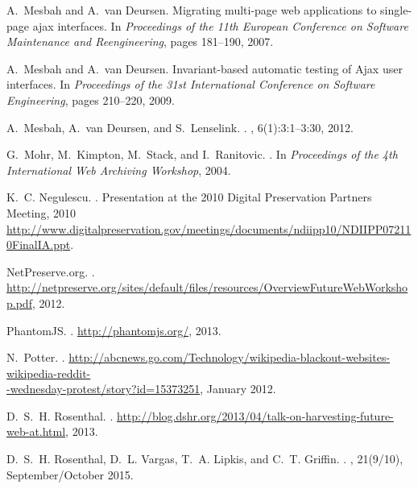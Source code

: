 \documentclass{sig-alternate}
\begin{document}
\begin{thebibliography}{10}
A.~Mesbah and A.~van Deursen.
\newblock Migrating multi-page web applications to single-page ajax interfaces.
\newblock In {\em Proceedings of the 11th European Conference on Software
  Maintenance and Reengineering}, pages 181--190, 2007.

A.~Mesbah and A.~van Deursen.
\newblock Invariant-based automatic testing of {A}jax user interfaces.
\newblock In {\em Proceedings of the 31st International Conference on Software
  Engineering}, pages 210--220, 2009.

A.~Mesbah, A.~van Deursen, and S.~Lenselink.
.
, 6(1):3:1--3:30, 2012.

G.~Mohr, M.~Kimpton, M.~Stack, and I.~Ranitovic.
.
\newblock In {\em Proceedings of the 4th International Web Archiving Workshop},
  2004.

K.~C. Negulescu.
.
\newblock Presentation at the 2010 Digital Preservation Partners Meeting, 2010
  \url{http://www.digitalpreservation.gov/meetings/documents/ndiipp10/NDIIPP072110FinalIA.ppt}.

{NetPreserve.org}.
.
\newblock
  \url{http://netpreserve.org/sites/default/files/resources/OverviewFutureWebWorkshop.pdf},
  2012.

{PhantomJS}.
.
\newblock \url{http://phantomjs.org/}, 2013.

N.~Potter.
.
\newblock
  \url{http://abcnews.go.com/Technology/wikipedia-blackout-websites-wikipedia-reddit-}\\\url{-wednesday-protest/story?id=15373251},
  January 2012.

D.~S.~H. Rosenthal.
.
\newblock
  \url{http://blog.dshr.org/2013/04/talk-on-harvesting-future-web-at.html},
  2013.

D.~S.~H. Rosenthal, D.~L. Vargas, T.~A. Lipkis, and C.~T. Griffin.
.
, 21(9/10), September/October 2015.


\end{thebibliography}
\end{document}

